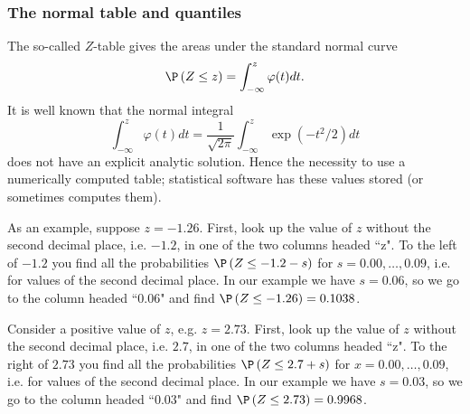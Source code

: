 
\subsubsection{The normal table and quantiles}

The so-called $Z$-table gives the areas under the standard normal curve%
\begin{equation*}
\P \left( Z\leq z\right) =\int_{-\infty }^{z}\varphi (t)dt.
\end{equation*}%
It is well known that the normal integral 
\begin{equation*}
\int_{-\infty }^{z}\varphi (t)dt=\frac{1}{\sqrt{2\pi }}\int_{-\infty
}^{z}\exp \left( -t^{2}/2\right) dt
\end{equation*}%
does not have an explicit analytic solution. Hence the necessity to use a
numerically computed table; statistical software has these values stored (or
sometimes computes them).

As an example, suppose $z=-1.26$. First, look up the value of $z$ without
the second decimal place, i.e. $-1.2$, in one of the two columns headed ``z".
To the left of $-1.2$ you find all the probabilities $\P \left( Z\leq
-1.2-s\right) $ for $s=0.00,\ldots ,0.09$, i.e. for values of the second
decimal place. In our example we have $s=0.06$, so we go to the column
headed ``$0.06$" and find $\P \left( Z\leq -1.26\right) =0.1038$.

Consider a positive value of $z$, e.g. $z=2.73.$ First, look up the value of 
$z$ without the second decimal place, i.e. $2.7$, in one of the two columns
headed ``z". To the right of $2.73$ you find all the probabilities $\P
\left( Z\leq 2.7+s\right) $ for $x=0.00,\ldots ,0.09$, i.e. for values of
the second decimal place. In our example we have $s=0.03$, so we go to the
column headed ``$0.03$" and find $\P \left( Z\leq 2.73\right) =0.9968$.

